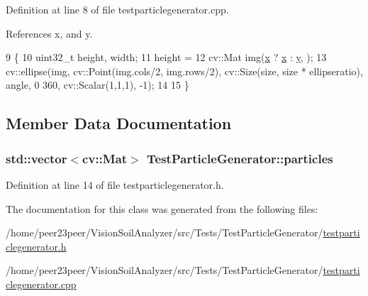 Definition at line 8 of file testparticlegenerator.\+cpp.



References x, and y.


\begin{DoxyCode}
9 \{
10     uint32\_t height, width;
11     height =
12     cv::Mat img(\hyperlink{_comparision_pictures_2_createtest_image_8m_a9336ebf25087d91c818ee6e9ec29f8c1}{x} ? \hyperlink{_comparision_pictures_2_createtest_image_8m_a9336ebf25087d91c818ee6e9ec29f8c1}{x} : \hyperlink{_comparision_pictures_2_createtest_image_8m_a2fb1c5cf58867b5bbc9a1b145a86f3a0}{y}, );
13     cv::ellipse(img, cv::Point(img.cols/2, img.rows/2), cv::Size(size, size * ellipseratio), angle, 0 360, 
      cv::Scalar(1,1,1), -1);
14 
15 \}
\end{DoxyCode}


\subsection{Member Data Documentation}
\hypertarget{class_test_particle_generator_a1e4b2448d046a953a6033a8a60354aa4}{}
\subsubsection[{particles}]{\setlength{\rightskip}{0pt plus 5cm}std\+::vector$<$cv\+::\+Mat$>$ Test\+Particle\+Generator\+::particles}\label{class_test_particle_generator_a1e4b2448d046a953a6033a8a60354aa4}


Definition at line 14 of file testparticlegenerator.\+h.



The documentation for this class was generated from the following files\+:\begin{DoxyCompactItemize}
\item 
/home/peer23peer/\+Vision\+Soil\+Analyzer/src/\+Tests/\+Test\+Particle\+Generator/\hyperlink{testparticlegenerator_8h}{testparticlegenerator.\+h}\item 
/home/peer23peer/\+Vision\+Soil\+Analyzer/src/\+Tests/\+Test\+Particle\+Generator/\hyperlink{testparticlegenerator_8cpp}{testparticlegenerator.\+cpp}\end{DoxyCompactItemize}
